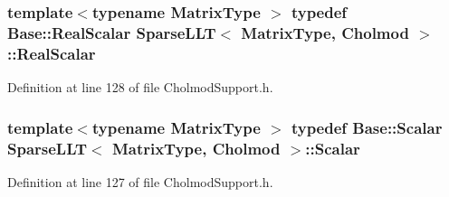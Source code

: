 \hypertarget{class_sparse_l_l_t_3_01_matrix_type_00_01_cholmod_01_4_a79b9069879f62d8c56e210aa1b1b545b}{
\subsubsection[{Real\-Scalar}]{\setlength{\rightskip}{0pt plus 5cm}template$<$typename Matrix\-Type $>$ typedef {\bf Base\-::\-Real\-Scalar} {\bf Sparse\-L\-L\-T}$<$ Matrix\-Type, {\bf Cholmod} $>$\-::{\bf Real\-Scalar}\hspace{0.3cm}{\ttfamily [protected]}}}\label{class_sparse_l_l_t_3_01_matrix_type_00_01_cholmod_01_4_a79b9069879f62d8c56e210aa1b1b545b}


Definition at line 128 of file Cholmod\-Support.\-h.

\hypertarget{class_sparse_l_l_t_3_01_matrix_type_00_01_cholmod_01_4_a5596883c159a7f38bb6d63ec36425f47}{
\subsubsection[{Scalar}]{\setlength{\rightskip}{0pt plus 5cm}template$<$typename Matrix\-Type $>$ typedef {\bf Base\-::\-Scalar} {\bf Sparse\-L\-L\-T}$<$ Matrix\-Type, {\bf Cholmod} $>$\-::{\bf Scalar}\hspace{0.3cm}{\ttfamily [protected]}}}\label{class_sparse_l_l_t_3_01_matrix_type_00_01_cholmod_01_4_a5596883c159a7f38bb6d63ec36425f47}


Definition at line 127 of file Cholmod\-Support.\-h.



